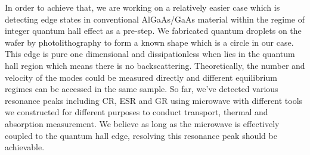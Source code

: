 \documentclass[12pt]{ruthesis}
\begin{document}
In order to achieve that, we are working on a relatively easier case which is detecting edge states in conventional AlGaAs/GaAs material within the regime of integer quantum hall effect as a pre-step.
We fabricated quantum droplets on the wafer by photolithography to form a known shape which is a circle in our case. This edge is pure one dimensional and dissipationless when lies in the quantum hall region which means there is no backscattering. Theoretically, the number and velocity of the modes could be measured directly and different equilibrium regimes can be accessed in the same sample.
So far, we've detected various resonance peaks including CR, ESR and GR using microwave with different tools we constructed for different purposes to conduct transport, thermal and absorption measurement.  
We believe as long as the microwave is effectively coupled to the quantum hall edge, resolving this resonance peak should be achievable.  



\appendix



\end{document}
